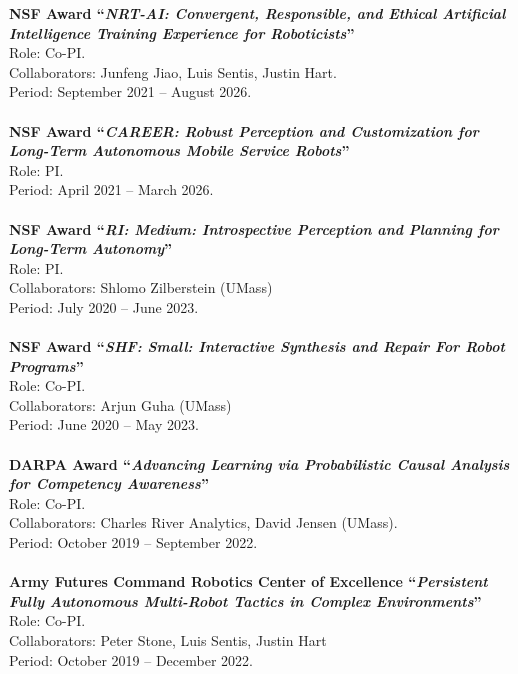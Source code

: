 \documentclass[Times]{article}
\newcommand{\funding}[1]{#1\\}
\renewcommand{\funding}[1]{\\}
\begin{document}
\textbf{NSF Award ``\emph{NRT-AI: Convergent, Responsible, and Ethical Artificial Intelligence Training Experience for Roboticists}''}\\
Role: Co-PI.\\
Collaborators: Junfeng Jiao, Luis Sentis, Justin Hart.\\
Period: September 2021 -- August 2026.\\
\funding{Amount: \$2,999,999.}

\textbf{NSF Award ``\emph{CAREER: Robust Perception and Customization for Long-Term Autonomous Mobile Service Robots}''}\\
Role: PI.\\
Period: April 2021 -- March 2026.\\
\funding{Amount: \$590,469.}

\textbf{NSF Award ``\emph{RI: Medium: Introspective Perception and Planning for Long-Term Autonomy}''}\\
Role: PI.\\
Collaborators: Shlomo Zilberstein (UMass)\\
Period: July 2020 -- June 2023.\\
\funding{PI Biswas' share: \$600,000.}

\textbf{NSF Award ``\emph{SHF: Small: Interactive Synthesis and Repair For Robot Programs}''}\\
Role: Co-PI.\\
Collaborators: Arjun Guha (UMass)\\
Period: June 2020 -- May 2023.\\
\funding{PI Biswas' share: \$250,001.}

\textbf{DARPA Award ``\emph{Advancing Learning via Probabilistic Causal Analysis for Competency Awareness}''}\\
Role: Co-PI.\\
Collaborators: Charles River Analytics, David Jensen (UMass).\\
Period: October 2019 -- September 2022.\\
\funding{PI Biswas' share: \$587,810.}

\textbf{Army Futures Command Robotics Center of Excellence ``\emph{Persistent Fully Autonomous Multi-Robot Tactics in Complex Environments}''}\\
Role: Co-PI.\\
Collaborators: Peter Stone, Luis Sentis, Justin Hart\\
Period: October 2019 -- December 2022.\\
\funding{Total funding: \$1,457,250.}
\end{document}
